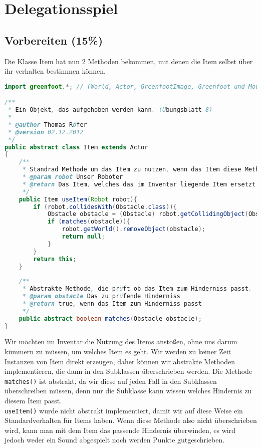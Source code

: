 \documentclass{pi1}
\begin{document}
\section{Delegationsspiel}

\subsection{Vorbereiten (15\%)}

Die Klasse Item hat nun 2 Methoden bekommen, mit denen die Item selbst über ihr verhalten bestimmen können.
\begin{lstlisting}[caption={Klasse \emph{Item}}, firstnumber=1, language=Java]
import greenfoot.*; // (World, Actor, GreenfootImage, Greenfoot und MouseInfo)

/**
 * Ein Objekt, das aufgehoben werden kann. (Übungsblatt 8)
 * 
 * @author Thomas Röfer
 * @version 02.12.2012
 */
public abstract class Item extends Actor
{
    /**
     * Standrad Methode um das Item zu nutzen, wenn das Item diese Methode nicht überschreibt
     * @param robot Unser Roboter
     * @return Das Item, welches das im Inventar liegende Item ersetzt
     */
    public Item useItem(Robot robot){
        if (robot.collidesWith(Obstacle.class)){
            Obstacle obstacle = (Obstacle) robot.getCollidingObject(Obstacle.class);
            if (matches(obstacle)){
                robot.getWorld().removeObject(obstacle);
                return null;
            }
        }
        return this;
    }
    
    /**
     * Abstrakte Methode, die prüft ob das Item zum Hinderniss passt.
     * @param obstacle Das zu prüfende Hinderniss
     * @return true, wenn das Item zum Hinderniss passt
     */
    public abstract boolean matches(Obstacle obstacle);
}

\end{lstlisting}

Wir möchten im Inventar die Nutzung des Items anstoßen, ohne uns darum kümmern zu müssen, um welches Item es geht.
Wir werden zu keiner Zeit Instanzen von Item direkt erzeugen, daher können wir abstrakte Methoden implementieren, die dann in den Subklassen überschrieben werden. Die Methode \texttt{matches()} ist abstrakt, da wir diese auf jeden Fall in den Subklassen überschreiben müssen, denn nur die Subklasse kann wissen welches Hindernis zu diesem Item passt.\\
\texttt{useItem()} wurde nicht abstrakt implementiert, damit wir auf diese Weise ein Standardverhalten für Items haben. Wenn diese Methode also nicht überschrieben wird, kann man mit dem Item das passende Hindernis überwinden, es wird jedoch weder ein Sound abgespielt noch werden Punkte gutgeschrieben.
\end{document}

